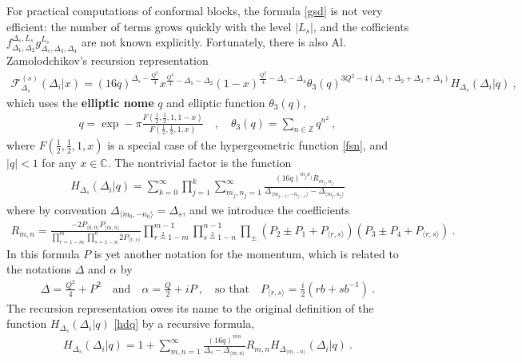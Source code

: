 \documentclass[12pt, a4paper, notitlepage, twoside]{report}
\numberwithin{equation}{section}
\theoremstyle{break}
\begin{document}
For practical computations of conformal blocks, the formula \eqref{gsd} is not very efficient: the number of terms grows quickly with the level $|L_s|$, and the cofficients $f_{\Delta_1,\Delta_2}^{\Delta_s,L_s} g^{L_s}_{\Delta_s,\Delta_3,\Delta_4}$ are not known explicitly.
Fortunately, there is also Al.
Zamolodchikov's recursion representation \cite{zz90}
\begin{align}
 \mathcal{F}^{(s)}_{\Delta_s}(\Delta_i|x) 
=  (16q)^{\Delta_s -\frac{Q^2}{4}} x^{\frac{Q^2}{4}-\Delta_1-\Delta_2} (1-x)^{\frac{Q^2}{4}-\Delta_1-\Delta_4} \theta_3(q)^{3Q^2-4(\Delta_1+\Delta_2+\Delta_3+\Delta_4)} H_{\Delta_s}(\Delta_i|q)\ ,
\end{align}
which uses the \textbf{elliptic nome} $q$ and elliptic function $\theta_3(q)$,
\begin{align}
 q = \exp -\pi \frac{F(\frac12,\frac12,1,1-x)}{F(\frac12,\frac12,1,x)}  \quad , \quad \theta_3(q) = \sum_{n\in{\mathbb{Z}}} q^{n^2}\ ,
\end{align}
where $F(\frac12,\frac12,1,x)$ is a special case of the hypergeometric function \eqref{fsn}, and $|q|<1$ for any $x\in\mathbb{C}$.
The nontrivial factor is the function
\begin{align}
 H_{\Delta_s}(\Delta_i|q) = \sum_{k=0}^\infty \prod_{j=1}^k \sum_{m_j,n_j=1}^\infty \frac{(16q)^{m_jn_j}R_{m_j,n_j}}{\Delta_{\langle m_{j-1},-n_{j-1} \rangle}-\Delta_{\langle m_j,n_j\rangle}}
\label{hdq}
\end{align}
where by convention $\Delta_{\langle m_0,-n_0\rangle} = \Delta_s$, and we introduce the coefficients
\begin{align}
 R_{m,n} = \frac{-2P_{\langle 0,0\rangle} P_{\langle m,n\rangle}}{\prod_{r=1-m}^m \prod_{s=1-n}^n 2P_{\langle r,s\rangle}}
\prod_{r\overset{2}{=}1-m}^{m-1} \prod_{s\overset{2}{=}1-n}^{n-1} \prod_\pm (P_2\pm P_1 + P_{\langle r,s\rangle}) (P_3\pm P_4 +P_{\langle r,s\rangle})\ .
\end{align}
In this formula $P$ is yet another notation for the momentum, which is related to the notations $\Delta$ and $\alpha$ by
\begin{align}
 \Delta = \frac{Q^2}{4} + P^2 \quad \text{and} \quad \alpha = \frac{Q}{2}+iP\ , \quad \text{so that} \quad P_{\langle r,s\rangle} = \frac{i}{2}\left(rb+sb^{-1}\right)\ .
 \label{pdef}
\end{align}
The recursion representation owes its name to the original definition of the function $H_{\Delta_s}(\Delta_i|q)$ \eqref{hdq} by a recursive formula,
\begin{align}
 H_{\Delta_s}(\Delta_i|q) = 1 + \sum_{m,n=1}^\infty \frac{(16q)^{mn}}{\Delta_s-\Delta_{\langle m,n\rangle}} R_{m,n} H_{\Delta_{\langle m,-n\rangle}}(\Delta_i|q)\ .
 \label{hrec}
\end{align}
\end{document}
